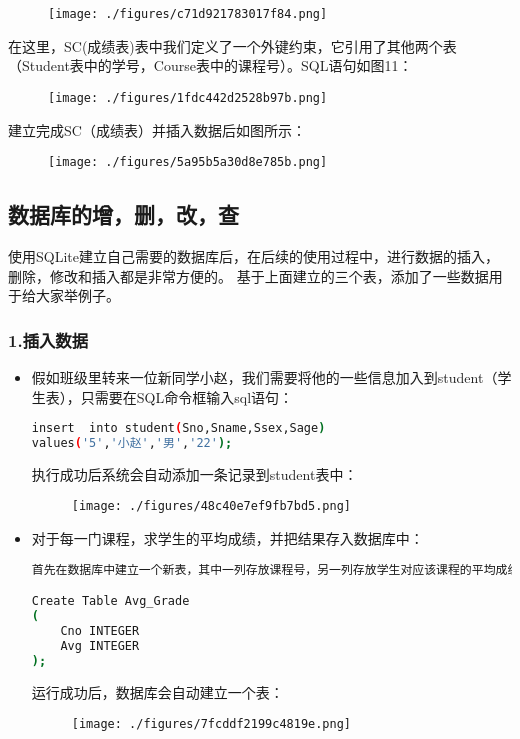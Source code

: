 \begin{figure}[ht]
\centering
\texttt{[image: ./figures/c71d921783017f84.png]}
\caption{} \label{fig_SQLint_10}
\end{figure}

在这里，SC(成绩表)表中我们定义了一个外键约束，它引用了其他两个表（Student表中的学号，Course表中的课程号）。SQL语句如图11：
\begin{figure}[ht]
\centering
\texttt{[image: ./figures/1fdc442d2528b97b.png]}
\caption{} \label{fig_SQLint_11}
\end{figure}

建立完成SC（成绩表）并插入数据后如图所示：
\begin{figure}[ht]
\centering
\texttt{[image: ./figures/5a95b5a30d8e785b.png]}
\caption{} \label{fig_SQLint_12}
\end{figure}

\subsection{数据库的增，删，改，查}
使用SQLite建立自己需要的数据库后，在后续的使用过程中，进行数据的插入，删除，修改和插入都是非常方便的。
基于上面建立的三个表，添加了一些数据用于给大家举例子。
\subsubsection{1.插入数据}

\begin{itemize}
\item 假如班级里转来一位新同学小赵，我们需要将他的一些信息加入到student（学生表），只需要在SQL命令框输入sql语句：

\begin{lstlisting}[language=bash]
insert  into student(Sno,Sname,Ssex,Sage)
values('5','小赵','男','22');
\end{lstlisting}
执行成功后系统会自动添加一条记录到student表中：
\begin{figure}[ht]
\centering
\texttt{[image: ./figures/48c40e7ef9fb7bd5.png]}
\caption{} \label{fig_SQLint_13}
\end{figure}
\end{itemize}

\begin{itemize}
\item 对于每一门课程，求学生的平均成绩，并把结果存入数据库中：
\begin{lstlisting}[language=bash]
首先在数据库中建立一个新表，其中一列存放课程号，另一列存放学生对应该课程的平均成绩

Create Table Avg_Grade
(
    Cno INTEGER
    Avg INTEGER
);

\end{lstlisting}
运行成功后，数据库会自动建立一个表：
\begin{figure}[ht]
\centering
\texttt{[image: ./figures/7fcddf2199c4819e.png]}
\caption{} \label{fig_SQLint_17}
\end{figure}
\end{itemize}

